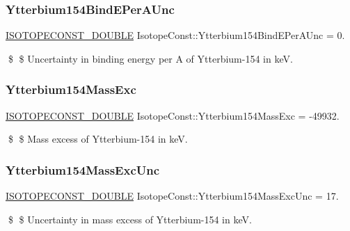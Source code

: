 \subsubsection{\texorpdfstring{Ytterbium154\+Bind\+E\+Per\+A\+Unc}{Ytterbium154BindEPerAUnc}}
{\footnotesize\ttfamily \mbox{\hyperlink{group___isotope_const-_macros_ga8f45a7272ce02c0b4c65c44636ed719a}{I\+S\+O\+T\+O\+P\+E\+C\+O\+N\+S\+T\+\_\+\+D\+O\+U\+B\+LE}} Isotope\+Const\+::\+Ytterbium154\+Bind\+E\+Per\+A\+Unc = 0.}

\$ \$ Uncertainty in binding energy per A of Ytterbium-\/154 in keV. \mbox{\label{group___isotope_const-_ytterbium-_yb154_gaa3eb4b9e39ed3beb7643f61daba66b6a}} 
\subsubsection{\texorpdfstring{Ytterbium154\+Mass\+Exc}{Ytterbium154MassExc}}
{\footnotesize\ttfamily \mbox{\hyperlink{group___isotope_const-_macros_ga8f45a7272ce02c0b4c65c44636ed719a}{I\+S\+O\+T\+O\+P\+E\+C\+O\+N\+S\+T\+\_\+\+D\+O\+U\+B\+LE}} Isotope\+Const\+::\+Ytterbium154\+Mass\+Exc = -\/49932.}

\$ \$ Mass excess of Ytterbium-\/154 in keV. \mbox{\label{group___isotope_const-_ytterbium-_yb154_ga5bdbf6af489e2c3e7ee27d463ca9f420}} 
\subsubsection{\texorpdfstring{Ytterbium154\+Mass\+Exc\+Unc}{Ytterbium154MassExcUnc}}
{\footnotesize\ttfamily \mbox{\hyperlink{group___isotope_const-_macros_ga8f45a7272ce02c0b4c65c44636ed719a}{I\+S\+O\+T\+O\+P\+E\+C\+O\+N\+S\+T\+\_\+\+D\+O\+U\+B\+LE}} Isotope\+Const\+::\+Ytterbium154\+Mass\+Exc\+Unc = 17.}

\$ \$ Uncertainty in mass excess of Ytterbium-\/154 in keV. \mbox{\label{group___isotope_const-_ytterbium-_yb154_gab36576b915a27eebeb2fc02718b0e75a}} 
